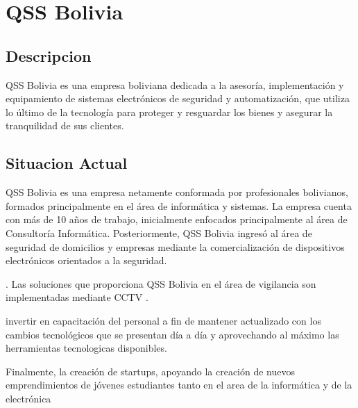 \chapter{QSS Bolivia}
\section{Descripcion}
 QSS Bolivia es una empresa boliviana dedicada a la asesoría, implementación y equipamiento de sistemas electrónicos de seguridad y automatización, que utiliza lo último de la tecnología para proteger y resguardar los bienes y asegurar la tranquilidad de sus clientes. 
\color{black}
\section{Situacion Actual}
QSS Bolivia es una empresa netamente conformada por profesionales bolivianos, formados principalmente en el área de informática y sistemas. La empresa cuenta con más de 10 años de trabajo, inicialmente enfocados principalmente al área de Consultoría Informática. Posteriormente, QSS Bolivia ingresó al área de seguridad de domicilios y empresas mediante la comercialización de dispositivos electrónicos orientados a la seguridad.

. Las soluciones que proporciona QSS Bolivia en el área de vigilancia son implementadas mediante CCTV . 

invertir en capacitación del personal a fin de mantener  actualizado con los cambios tecnológicos que se presentan día a día y aprovechando al máximo las herramientas tecnologicas disponibles. 

Finalmente, la creación de startups, apoyando la creación de nuevos emprendimientos de jóvenes estudiantes tanto en el area de la informática y de la electrónica  